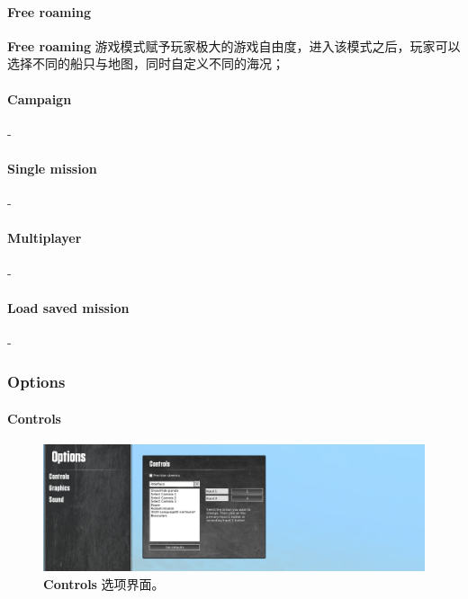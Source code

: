 \documentclass[letterpaper,10pt]{article}
\begin{document}
				\paragraph{Free roaming} 
				
				\textbf{Free roaming} 游戏模式赋予玩家极大的游戏自由度，进入该模式之后，玩家可以选择不同的船只与地图，同时自定义不同的海况；
				
				\paragraph{Campaign}
				
				-
				
				\paragraph{Single mission}
				
				-
				
				\paragraph{Multiplayer}
				
				-
				
				\paragraph{Load saved mission}
				
				-
				
				\subsubsection{Options}
				
					\paragraph{Controls}
					
					\begin{figure}[htbp]
						\centering 
						\includegraphics[width=0.7\columnwidth]{picture/Options_Controls}
						\caption{
							\label{fig: Options_Controls} 
							\textbf{Controls} 选项界面。
						}	
					\end{figure}
					
\end{document}
